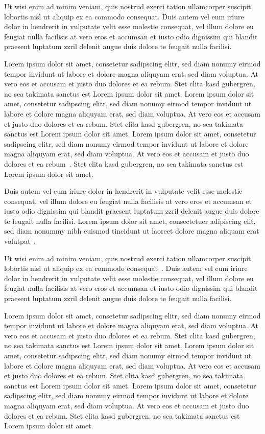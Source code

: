 \documentclass[journal]{vgtc}
\begin{document}
Ut wisi enim ad minim veniam, quis nostrud exerci tation ullamcorper
suscipit lobortis nisl ut aliquip ex ea commodo consequat. Duis autem
vel eum iriure dolor in hendrerit in vulputate velit esse molestie
consequat, vel illum dolore eu feugiat nulla facilisis at vero eros et
accumsan et iusto odio dignissim qui blandit praesent luptatum zzril
delenit augue duis dolore te feugait nulla facilisi.



Lorem ipsum dolor sit amet, consetetur sadipscing elitr, sed diam
nonumy eirmod tempor invidunt ut labore et dolore magna aliquyam erat,
sed diam voluptua. At vero eos et accusam et justo duo dolores et ea
rebum. Stet clita kasd gubergren, no sea takimata sanctus est Lorem
ipsum dolor sit amet. Lorem ipsum dolor sit amet, consetetur
sadipscing elitr, sed diam nonumy eirmod tempor invidunt ut labore et
dolore magna aliquyam erat, sed diam voluptua. At vero eos et accusam
et justo duo dolores et ea rebum. Stet clita kasd gubergren, no sea
takimata sanctus est Lorem ipsum dolor sit amet. Lorem ipsum dolor sit
amet, consetetur sadipscing elitr, sed diam nonumy eirmod tempor
invidunt ut labore et dolore magna aliquyam erat, sed diam
voluptua. At vero eos et accusam et justo duo dolores et ea
rebum~\cite{ware:2004:IVP}. Stet clita kasd gubergren, no sea takimata
sanctus est Lorem ipsum dolor sit amet.

Duis autem vel eum iriure dolor in hendrerit in vulputate velit esse
molestie consequat, vel illum dolore eu feugiat nulla facilisis at
vero eros et accumsan et iusto odio dignissim qui blandit praesent
luptatum zzril delenit augue duis dolore te feugait nulla
facilisi. Lorem ipsum dolor sit amet, consectetuer adipiscing elit,
sed diam nonummy nibh euismod tincidunt ut laoreet dolore magna
aliquam erat volutpat~\cite{kindlmann:1999:SAG}.

Ut wisi enim ad minim veniam, quis nostrud exerci tation ullamcorper
suscipit lobortis nisl ut aliquip ex ea commodo
consequat~\cite{levoy:1989:DSV}. Duis autem vel eum iriure dolor in
hendrerit in vulputate velit esse molestie consequat, vel illum dolore
eu feugiat nulla facilisis at vero eros et accumsan et iusto odio
dignissim qui blandit praesent luptatum zzril delenit augue duis
dolore te feugait nulla facilisi.

Lorem ipsum dolor sit amet, consetetur sadipscing elitr, sed diam
nonumy eirmod tempor invidunt ut labore et dolore magna aliquyam erat,
sed diam voluptua. At vero eos et accusam et justo duo dolores et ea
rebum. Stet clita kasd gubergren, no sea takimata sanctus est Lorem
ipsum dolor sit amet. Lorem ipsum dolor sit amet, consetetur
sadipscing elitr, sed diam nonumy eirmod tempor invidunt ut labore et
dolore magna aliquyam erat, sed diam voluptua. At vero eos et accusam
et justo duo dolores et ea rebum. Stet clita kasd gubergren, no sea
takimata sanctus est Lorem ipsum dolor sit amet. Lorem ipsum dolor sit
amet, consetetur sadipscing elitr, sed diam nonumy eirmod tempor
invidunt ut labore et dolore magna aliquyam erat, sed diam
voluptua. At vero eos et accusam et justo duo dolores et ea
rebum. Stet clita kasd gubergren, no sea takimata sanctus est Lorem
ipsum dolor sit amet.
\end{document}
